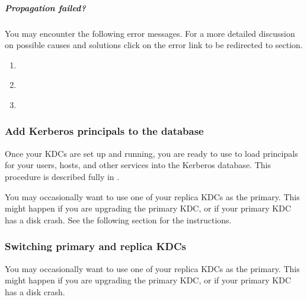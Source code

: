 \documentclass[letterpaper,10pt,english]{sphinxmanual}
\begin{document}
\subparagraph{Propagation failed?}
\label{\detokenize{admin/install_kdc:propagation-failed}}
\sphinxAtStartPar
You may encounter the following error messages. For a more detailed
discussion on possible causes and solutions click on the error link
to be redirected to {\hyperref[\detokenize{admin/troubleshoot:troubleshoot}]{}} section.
\begin{enumerate}
%
\item {} 
\sphinxAtStartPar
{\hyperref[\detokenize{admin/troubleshoot:kprop-no-route}]{}}

\item {} 
\sphinxAtStartPar
{\hyperref[\detokenize{admin/troubleshoot:kprop-con-refused}]{}}

\item {} 
\sphinxAtStartPar
{\hyperref[\detokenize{admin/troubleshoot:kprop-sendauth-exchange}]{}}

\end{enumerate}


\subsubsection{Add Kerberos principals to the database}
\label{\detokenize{admin/install_kdc:add-kerberos-principals-to-the-database}}
\sphinxAtStartPar
Once your KDCs are set up and running, you are ready to use
{\hyperref[\detokenize{admin/admin_commands/kadmin_local:kadmin-1}]{}} to load principals for your users, hosts, and other
services into the Kerberos database.  This procedure is described
fully in {\hyperref[\detokenize{admin/database:principals}]{}}.

\sphinxAtStartPar
You may occasionally want to use one of your replica KDCs as the
primary.  This might happen if you are upgrading the primary KDC, or
if your primary KDC has a disk crash.  See the following section for
the instructions.


\subsubsection{Switching primary and replica KDCs}
\label{\detokenize{admin/install_kdc:switching-primary-and-replica-kdcs}}\label{\detokenize{admin/install_kdc:switch-primary-replica}}
\sphinxAtStartPar
You may occasionally want to use one of your replica KDCs as the
primary.  This might happen if you are upgrading the primary KDC, or
if your primary KDC has a disk crash.
\end{document}
